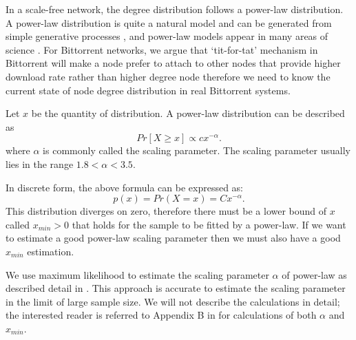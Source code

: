 \documentclass[10pt,conference,letterpaper]{IEEEtran}
\begin{document}
In a scale-free network, the degree distribution follows a power-law distribution.   
A power-law distribution is quite a natural model and can be generated from simple generative processes \cite{mitzenmacher2004brief}, and power-law models appear in many areas of science \cite{clauset2009power} \cite{mitzenmacher2004brief}. 
For Bittorrent networks, we argue that `tit-for-tat' mechanism in Bittorrent will make a node prefer to attach to other nodes that provide higher download rate rather than higher degree node therefore we need to know the current state of node degree distribution in real Bittorrent systems.

Let $x$ be the quantity of distribution. 
A power-law distribution can be described as
\begin{equation}
Pr[X\ge x] \propto cx^{-\alpha}.
\label{eq:powerlaw}
\end{equation}
where $\alpha$ is commonly called the scaling parameter. 
The scaling parameter usually lies in the range $1.8<\alpha<3.5$.

In discrete form, the above formula can be expressed as:
\begin{equation}
p(x) = Pr(X=x) = Cx^{- \alpha}.
\label{eq:powerlawdiscrete}
\end{equation}
This distribution diverges on zero, therefore there must be a lower bound of $x$ called $x_{min} > 0$ that holds for the sample to be fitted by a power-law. 
If we want to estimate a good power-law scaling parameter then we must also have a good $x_{min}$ estimation. 


We use maximum likelihood to estimate the scaling parameter $\alpha$ of power-law as described detail in \cite{clauset2009power}.  
This approach is accurate to estimate the scaling parameter in the limit of large sample size.  
We will not describe the calculations in detail; the interested reader is referred to Appendix B in \cite{clauset2009power} for calculations of both $\alpha$ and $x_{min}$.
\end{document}
